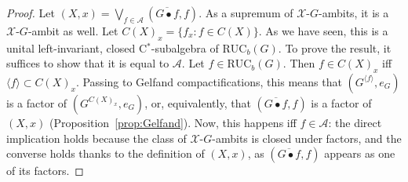 \documentclass[10pt,a4paper]{article}
\theoremstyle{definition}
\numberwithin{equation}{section}
\numberwithin{figure}{section}
\numberwithin{table}{section}
\newcommand{\A}{\mathcal A}
\newcommand{\RUCB}{\mathrm{RUC}_{b}}
\begin{document}
\begin{proof}
Let $(X,x)=\bigvee_{f\in \A}(\overline{G\bullet f},f)$. As a supremum of $\mathcal X$-$G$-ambits, it is a $\mathcal X$-$G$-ambit as well. Let $C(X)_{x} = \{ f_{x}:f\in C(X)\}$. As we have seen, this is a unital left-invariant, closed C$^{*}$-subalgebra of $\RUCB(G)$. To prove the result, it suffices to show that it is equal to $\A$. Let $f\in \RUCB(G)$. Then $f\in C(X)_{x}$ iff $\langle f\rangle \subset C(X)_{x}$. Passing to Gelfand compactifications, this means that $(G^{\langle f \rangle},e_{G})$ is a factor of $(G^{C(X)_{x}},e_{G})$, or, equivalently, that $(\overline{G\bullet f},f)$ is a factor of $(X,x)$ (Proposition~\ref{prop:Gelfand}). Now, this happens iff $f\in \A$: the direct implication holds because the class of $\mathcal X$-$G$-ambits is closed under factors, and the converse holds thanks to the definition of $(X,x)$, as $(\overline{G\bullet f},f)$ appears as one of its factors.
\end{proof}
\end{document}
